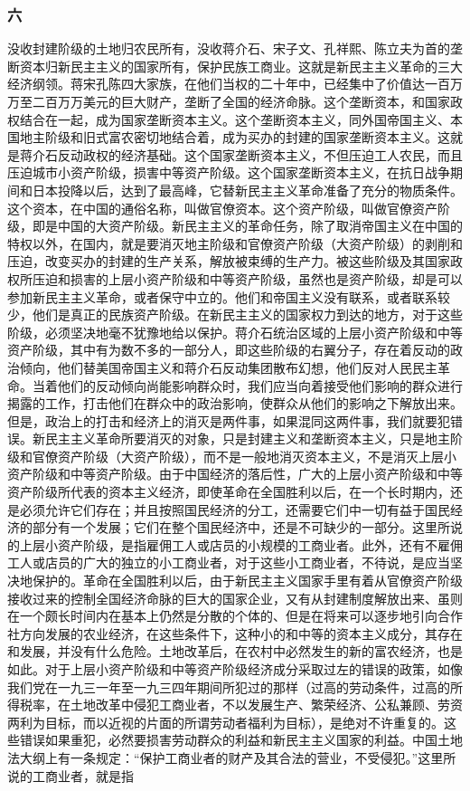 \documentclass[cn,11pt,chinese]{elegantbook}
\def\myformat#1{\hfil\hfil #1}
\begin{document}
\subsubsection*{\myformat{六}}
没收封建阶级的土地归农民所有，没收蒋介石、宋子文、孔祥熙、陈立夫为首的垄断资本归新民主主义的国家所有，保护民族工商业。这就是新民主主义革命的三大经济纲领。蒋宋孔陈四大家族，在他们当权的二十年中，已经集中了价值达一百万万至二百万万美元的巨大财产，垄断了全国的经济命脉。这个垄断资本，和国家政权结合在一起，成为国家垄断资本主义。这个垄断资本主义，同外国帝国主义、本国地主阶级和旧式富农密切地结合着，成为买办的封建的国家垄断资本主义。这就是蒋介石反动政权的经济基础。这个国家垄断资本主义，不但压迫工人农民，而且压迫城市小资产阶级，损害中等资产阶级。这个国家垄断资本主义，在抗日战争期间和日本投降以后，达到了最高峰，它替新民主主义革命准备了充分的物质条件。这个资本，在中国的通俗名称，叫做官僚资本。这个资产阶级，叫做官僚资产阶级，即是中国的大资产阶级。新民主主义的革命任务，除了取消帝国主义在中国的特权以外，在国内，就是要消灭地主阶级和官僚资产阶级（大资产阶级）的剥削和压迫，改变买办的封建的生产关系，解放被束缚的生产力。被这些阶级及其国家政权所压迫和损害的上层小资产阶级和中等资产阶级，虽然也是资产阶级，却是可以参加新民主主义革命，或者保守中立的。他们和帝国主义没有联系，或者联系较少，他们是真正的民族资产阶级。在新民主主义的国家权力到达的地方，对于这些阶级，必须坚决地毫不犹豫地给以保护。蒋介石统治区域的上层小资产阶级和中等资产阶级，其中有为数不多的一部分人，即这些阶级的右翼分子，存在着反动的政治倾向，他们替美国帝国主义和蒋介石反动集团散布幻想，他们反对人民民主革命。当着他们的反动倾向尚能影响群众时，我们应当向着接受他们影响的群众进行揭露的工作，打击他们在群众中的政治影响，使群众从他们的影响之下解放出来。但是，政治上的打击和经济上的消灭是两件事，如果混同这两件事，我们就要犯错误。新民主主义革命所要消灭的对象，只是封建主义和垄断资本主义，只是地主阶级和官僚资产阶级（大资产阶级），而不是一般地消灭资本主义，不是消灭上层小资产阶级和中等资产阶级。由于中国经济的落后性，广大的上层小资产阶级和中等资产阶级所代表的资本主义经济，即使革命在全国胜利以后，在一个长时期内，还是必须允许它们存在；并且按照国民经济的分工，还需要它们中一切有益于国民经济的部分有一个发展；它们在整个国民经济中，还是不可缺少的一部分。这里所说的上层小资产阶级，是指雇佣工人或店员的小规模的工商业者。此外，还有不雇佣工人或店员的广大的独立的小工商业者，对于这些小工商业者，不待说，是应当坚决地保护的。革命在全国胜利以后，由于新民主主义国家手里有着从官僚资产阶级接收过来的控制全国经济命脉的巨大的国家企业，又有从封建制度解放出来、虽则在一个颇长时间内在基本上仍然是分散的个体的、但是在将来可以逐步地引向合作社方向发展的农业经济，在这些条件下，这种小的和中等的资本主义成分，其存在和发展，并没有什么危险。土地改革后，在农村中必然发生的新的富农经济，也是如此。对于上层小资产阶级和中等资产阶级经济成分采取过左的错误的政策，如像我们党在一九三一年至一九三四年期间所犯过的那样（过高的劳动条件，过高的所得税率，在土地改革中侵犯工商业者，不以发展生产、繁荣经济、公私兼顾、劳资两利为目标，而以近视的片面的所谓劳动者福利为目标），是绝对不许重复的。这些错误如果重犯，必然要损害劳动群众的利益和新民主主义国家的利益。中国土地法大纲上有一条规定：“保护工商业者的财产及其合法的营业，不受侵犯。”这里所说的工商业者，就是指
\end{document}
